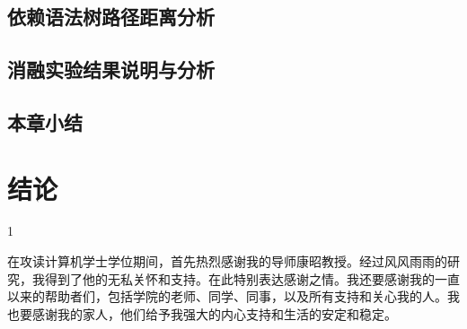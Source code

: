 \documentclass[bachelor]{thesis-uestc}
\begin{document}
\section{依赖语法树路径距离分析}

\section{消融实验结果说明与分析}

\section{本章小结}
\newpage
\chapter{结论}
1
\begin{comment}
    在工作总结的基础上，经过分析、归纳，明确结论：
①系统功能、指标等是否实现或达到课题要求（工程技
术及软件课题）
②理论结果是否正确、所建模型是否合理（理论课题）
41③所阐述的观点是否正确（文科课题）
④本课题有待进一步解决的问题及方向
⑤本人收获及体会
\end{comment}
\thesisacknowledgement
在攻读计算机学士学位期间，首先热烈感谢我的导师康昭教授。经过风风雨雨的研究，我得到了他的无私关怀和支持。在此特别表达感谢之情。我还要感谢我的一直以来的帮助者们，包括学院的老师、同学、同事，以及所有支持和关心我的人。我也要感谢我的家人，他们给予我强大的内心支持和生活的安定和稳定。

%

%
%

%
%



\end{document}

